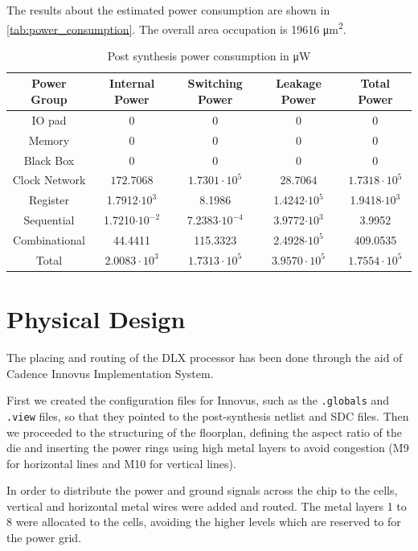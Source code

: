 The results about the estimated power consumption are shown in \autoref{tab:power_consumption}. 
The overall area occupation is 19616 \si{\micro\meter\squared}.

\begin{table}[]
    \centering
    \begin{tabular}{|c|c|c|c|c|}
\hline
Power Group & Internal Power & Switching Power & Leakage Power & Total Power\\
\hline
    IO pad & 0 & 0  & 0 &  0 \\
    Memory & 0 & 0  & 0 &  0 \\
    Black Box & 0 & 0 & 0 &  0 \\
    Clock Network & $172.7068$ & $1.7301\cdot10^5$ & $28.7064$ & $1.7318\cdot 10^5$ \\
    Register & 1.7912$\cdot 10^3$ & 8.1986 & 1.4242$\cdot 10^5$ & 1.9418$\cdot 10^3$ \\
    Sequential & 1.7210$\cdot 10^{-2}$ & 7.2383$\cdot 10^{-4}$ & 3.9772$\cdot 10^3$ & 3.9952 \\
    Combinational & 44.4411 & 115.3323 & 2.4928$\cdot 10^5$ & 409.0535 \\
\hline
Total & $2.0083 \cdot 10^3$ & $1.7313 \cdot 10^5$ & $3.9570 \cdot 10^5$ & $1.7554 \cdot 10^5$ \\
\hline
    \end{tabular}
    \caption{Post synthesis power consumption in \si{\micro\watt}}
    \label{tab:power_consumption}
\end{table}

\section{Physical Design}

The placing and routing of the DLX processor has been done through the aid of Cadence Innovus Implementation System.

First we created the configuration files for Innovus, such as the \texttt{.globals} and \texttt{.view} files, so that they pointed to the post-synthesis netlist and SDC files. 
Then we proceeded to the structuring of the floorplan, defining the aspect ratio of the die and inserting the power rings using high metal layers to avoid congestion (M9 for horizontal lines and M10 for vertical lines). 

In order to distribute the power and ground signals across the chip to the cells, vertical and horizontal metal wires were added and routed.
The metal layers 1 to 8 were allocated to the cells, avoiding the higher levels which are reserved to for the power grid.

